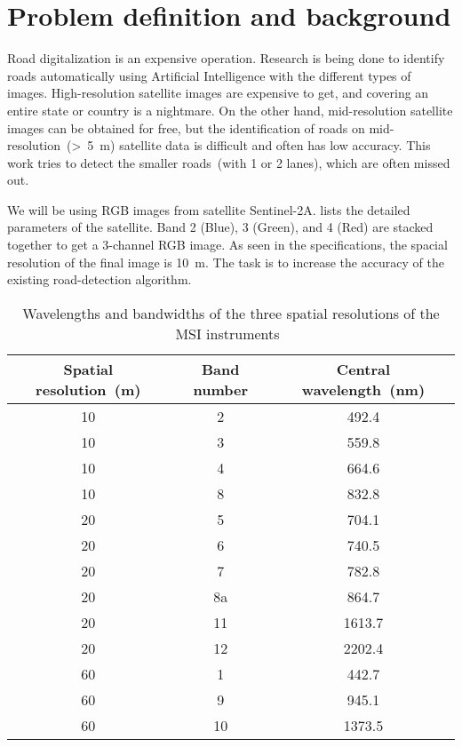 \chapter{Problem definition and background}\label{chapt:problem}
Road digitalization is an expensive operation. Research is being done to identify roads automatically using Artificial Intelligence with the different types of images. High-resolution satellite images are expensive to get, and covering an entire state or country is a nightmare. On the other hand, mid-resolution satellite images can be obtained for free, but the identification of roads on mid-resolution~(>~5~m) satellite data is difficult and often has low accuracy. This work tries to detect the smaller roads~(with 1 or 2 lanes), which are often missed out.

We will be using RGB images from satellite Sentinel-2A.  lists the detailed parameters of the satellite. Band 2 (Blue), 3 (Green), and 4 (Red) are stacked together to get a 3-channel RGB image. As seen in the specifications, the spacial resolution of the final image is 10~m. The task is to increase the accuracy of the existing road-detection algorithm.

\begin{table}[h!]
  \centering
  \begin{tabular}{ |c|c|c| }
    \hline
    Spatial resolution~(m) & Band number & Central wavelength~(nm) \\
    \hline
    10&2&492.4 \\
    10&3&559.8 \\
    10&4&664.6 \\
    10&8&832.8 \\
    20&5&704.1 \\
    20&6&740.5 \\
    20&7&782.8 \\
    20&8a&864.7 \\
    20&11&1613.7 \\
    20&12&2202.4 \\
    60&1&442.7 \\
    60&9&945.1 \\
    60&10&1373.5 \\
    \hline
  \end{tabular}
  \caption[Wavelengths and bandwidths of the three spatial resolutions of the MSI instruments]{Wavelengths and bandwidths of the three spatial resolutions of the MSI instruments~\cite{sentinelSpecifications}}
  \label{tab:sentinel-resolution}
\end{table}

